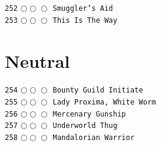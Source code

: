 \documentclass[a4paper,landscape]{article}
\begin{document}
\begin{multicols*}{5}
\texttt{252} \(\bigcirc\!\bigcirc\!\bigcirc\)  \texttt{Smuggler’s Aid} \vspace{-0.3mm}\\ 
\texttt{253} \(\bigcirc\!\bigcirc\!\bigcirc\)  \texttt{This Is The Way} \vspace{-0.3mm}\\ 
\section{Neutral} 
\vspace{-2mm} 
\texttt{254} \(\bigcirc\!\bigcirc\!\bigcirc\)  \texttt{Bounty Guild Initiate} \vspace{-0.3mm}\\ 
\texttt{255} \(\bigcirc\!\bigcirc\!\bigcirc\)  \texttt{Lady Proxima, White Worm } \vspace{-0.3mm}\\ 
\texttt{256} \(\bigcirc\!\bigcirc\!\bigcirc\)  \texttt{Mercenary Gunship} \vspace{-0.3mm}\\ 
\texttt{257} \(\bigcirc\!\bigcirc\!\bigcirc\)  \texttt{Underworld Thug} \vspace{-0.3mm}\\ 
\texttt{258} \(\bigcirc\!\bigcirc\!\bigcirc\)  \texttt{Mandalorian Warrior} \vspace{-0.3mm}\\ 

\end{multicols*}
\end{document}
